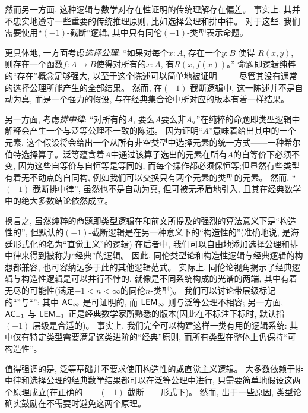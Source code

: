 然而另一方面, 这种逻辑与数学对存在性证明的传统理解存在偏差。
事实上, 其并不忠实地遵守一些重要的传统推理原则, 比如选择公理和排中律。
对于这些, 我们需要使用``$(-1)$-截断''逻辑, 其中只有同伦$(-1)$-类型表示命题。

%
更具体地, 一方面考虑\emph{选择公理}: ``如果对每个$x : A$, 存在一个$y : B$ 使得 $R(x, y)$, 则存在一个函数$f: A \to B$使得对所有的$x : A$, 有$R(x, f(x))$。''
命题即逻辑纯粹的``存在''概念足够强大, 以至于这个陈述可以简单地被证明 —— 尽管其没有通常的选择公理所能产生的全部结果。
然而, 在$(-1)$-截断逻辑中, 这一陈述并不是自动为真, 而是一个强力的假设, 与在经典集合论中所对应的版本有着一样结果。

%
%
另一方面, 考虑\emph{排中律}: ``对所有的$A$, 要么$A$要么非$A$。''在纯粹的命题即类型逻辑中解释会产生一个与泛等公理不一致的陈述。
因为证明``$A$''意味着给出其中的一个元素, 这个假设将会给出一个从所有非空类型中选择元素的统一方式——一种希尔伯特选择算子。泛等蕴含着$A$中通过该算子选出的元素在所有$A$的自等价下必须不变,
因为这些自等价与自恒等是等同的, 而每个操作都必须保恒等;但显然有些类型有着无不动点的自同构, 例如我们可以交换只有两个元素的类型的元素。
%
然而, ``$(-1)$-截断排中律'', 虽然也不是自动为真, 但可被无矛盾地引入, 且其在经典数学中的绝大多数结论依然成立。

换言之, 虽然纯粹的命题即类型逻辑在和前文所提及的强烈的算法意义下是``构造性的'',
但默认的$(-1)$-截断逻辑是在另一种意义下的``构造性的''(准确地说, 是海廷形式化的名为``直觉主义''的逻辑)
在后者中, 我们可以自由地添加选择公理和排中律来得到被称为``经典''的逻辑。
因此, 同伦类型论和构造性逻辑与经典逻辑的构想都兼容, 也可容纳远多于此的其他逻辑范式。
%
实际上, 同伦论视角揭示了经典逻辑与构造性逻辑是可以并行不悖的, 就像是不同系统构成的光谱的两端, 其中有着无尽的可能性(满足$-1 < n < \infty$的同伦$n$-类型)。 
我们可以讨论带层级标记的``''与``'': 其中 $\mathsf{AC}_{\infty}$ 是可证明的, 而 $\mathsf{LEM}_{\infty}$ 则与泛等公理不相容;
另一方面, $\mathsf{AC}_{-1}$ 与 $\mathsf{LEM}_{-1}$ 正是经典数学家所熟悉的版本(因此在不标注下标时, 默认指 $(-1)$ 层级是合适的)。
事实上, 我们完全可以构建这样一类有用的逻辑系统: 其中仅有特定类型需要满足这类进阶的``经典''原则, 而所有类型在整体上仍保持``可构造性''。%

值得强调的是, 泛等基础并不要求使用构造性的或直觉主义逻辑。 %
大多数依赖于排中律和选择公理的经典数学结果都可以在泛等公理中进行, 只需要简单地假设这两个原理成立(在正确的——$(-1)$-截断——形式下)。
然而, 出于一些原因, 类型论确实鼓励在不需要时避免这两个原理。

